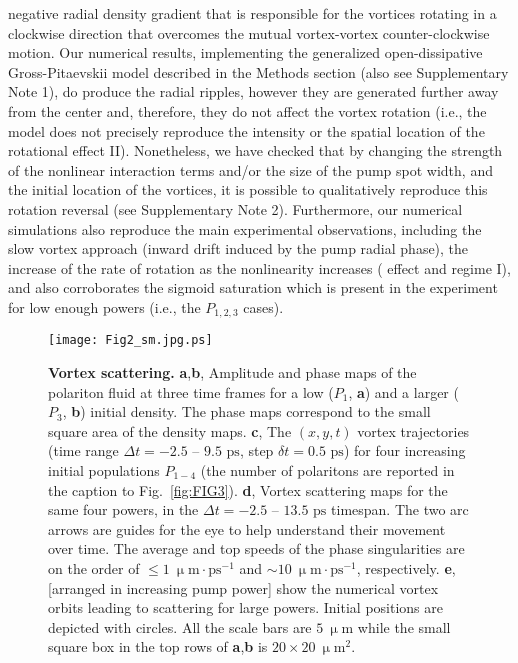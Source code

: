 \documentclass[aps,prb,twocolumn,superscriptaddress,nofootinbib]{revtex4}
\def\editr#1{#1}
\def\edstrike#1{}
\begin{document}
\editr{negative} radial density gradient that is responsible for the vortices rotating
in a \editr{clockwise} direction that overcomes the mutual vortex-vortex
counter-clockwise motion.
%
Our numerical results, implementing the generalized open-dissipative
Gross-Pitaevskii model described in the Methods section \editr{(also see Supplementary Note 1)},
do produce the radial ripples, however
they are generated further away from the center and, therefore, they do not
affect the vortex rotation (i.e., the model does not precisely reproduce the intensity or the
spatial location of the \edstrike{action} \editr{rotational effect} II).
Nonetheless, we have checked that by changing the strength of the nonlinear
interaction terms 
and/or the size of the pump spot width, and the initial location of the vortices,
it is possible to qualitatively reproduce this rotation reversal 
\editr{(see Supplementary Note 2)}.
%
Furthermore, our numerical simulations also
reproduce the main experimental observations,
including the slow vortex approach (\editr{inward drift induced by} the pump radial phase),
the increase of the rate of rotation as the nonlinearity
increases (\edstrike{driving action} \editr{effect and regime} I), and also corroborates the sigmoid saturation
which is present in the experiment for low enough powers \editr{(i.e., the $P_{1,2,3}$ cases)}.\\



\begin{figure*}[htbp]
\centering
\texttt{[image: Fig2\_sm.jpg.ps]}
\caption{{\bf Vortex scattering.}
\textbf{a},\textbf{b}, Amplitude and phase maps of the polariton fluid at three time frames
for a low ($P_1$, \textbf{a}) and a larger ($P_3$, \textbf{b}) initial density.
The phase maps correspond to the small square area of the density maps.
\textbf{c}, The $(x,y,t)$ vortex trajectories (time range $\Delta t=-2.5 \text{ -- } 9.5\text{ ps}$,
step $\delta t=0.5\text{ ps}$) for four increasing initial populations $P_{1-4}$
(the number of polaritons are reported in the caption to Fig.~\ref{fig:FIG3}).
\textbf{d}, Vortex scattering maps for the same four powers,
in the $\Delta t=-2.5 \text{ -- } 13.5\text{ ps}$ timespan.
The two arc arrows are guides for the eye
to help understand their movement over time.
The average and top speeds of the phase singularities are on the order of $\leq1~\upmu\text{m} \cdot \text{ps}^{-1}$
and $\sim10~\upmu\text{m} \cdot \text{ps}^{-1}$, respectively.
\textbf{e}, [arranged in increasing pump power] show the numerical
vortex orbits leading to scattering for large powers. Initial
positions are depicted with circles.
\editr{All the scale bars are $5~\upmu\text{m}$ while the small square box in the top rows of \textbf{a},\textbf{b} is $20\times20~\upmu\text{m}^2$.}
}
\label{fig:FIG2}
\end{figure*}
\end{document}
